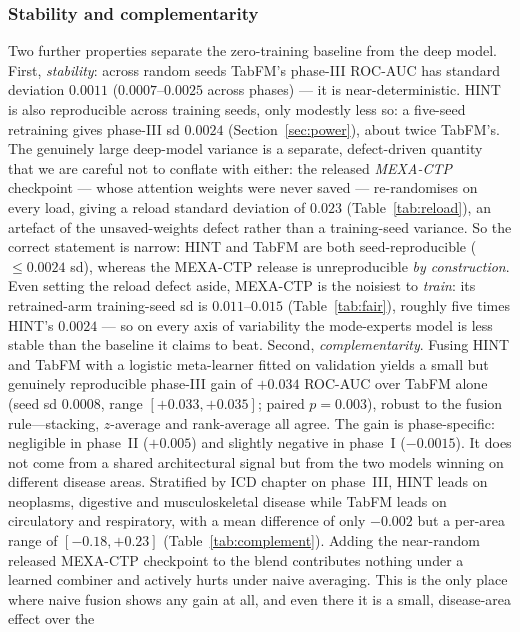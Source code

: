 \documentclass[a4paper,fleqn]{cas-sc}
\begin{document}
\subsubsection{Stability and complementarity}
\label{sec:complementarity}
Two further properties separate the zero-training baseline from the deep model. First,
\emph{stability}: across random seeds TabFM's phase-III ROC-AUC has standard deviation
$0.0011$ ($0.0007$--$0.0025$ across phases) --- it is near-deterministic. HINT is also
reproducible across training seeds, only modestly less so: a five-seed retraining gives phase-III
sd $0.0024$ (Section~\ref{sec:power}), about twice TabFM's. The genuinely large deep-model
variance is a separate, defect-driven quantity that we are careful not to conflate with either:
the released \emph{MEXA-CTP} checkpoint --- whose attention weights were never saved ---
re-randomises on every load, giving a reload standard deviation of $0.023$ (Table~\ref{tab:reload}),
an artefact of the unsaved-weights defect rather than a training-seed variance. So the correct
statement is narrow: HINT and TabFM are both seed-reproducible ($\le0.0024$ sd), whereas the
MEXA-CTP release is unreproducible \emph{by construction}. Even setting the reload defect aside,
MEXA-CTP is the noisiest to \emph{train}: its retrained-arm training-seed sd is $0.011$--$0.015$
(Table~\ref{tab:fair}), roughly five times HINT's $0.0024$ --- so on every axis of variability the
mode-experts model is less stable than the baseline it claims to beat.
Second, \emph{complementarity}. Fusing HINT and TabFM with a logistic meta-learner fitted on
validation yields a small but genuinely reproducible phase-III gain of $+0.034$ ROC-AUC over
TabFM alone (seed sd $0.0008$, range $[+0.033,+0.035]$; paired $p=0.003$), robust to the
fusion rule---stacking, $z$-average and rank-average all agree. The gain is phase-specific:
negligible in phase~II ($+0.005$) and slightly negative in phase~I ($-0.0015$). It does not
come from a shared architectural signal but from the two models winning on different disease
areas. Stratified by ICD chapter on phase~III, HINT leads on neoplasms, digestive and
musculoskeletal disease while TabFM leads on circulatory and respiratory, with a mean
difference of only $-0.002$ but a per-area range of $[-0.18,+0.23]$ (Table~\ref{tab:complement}).
Adding the near-random released MEXA-CTP checkpoint to the blend contributes nothing under a
learned combiner and actively hurts under naive averaging. This is the only place where naive
fusion shows any gain at all, and even there it is a small, disease-area effect over the
\end{document}
